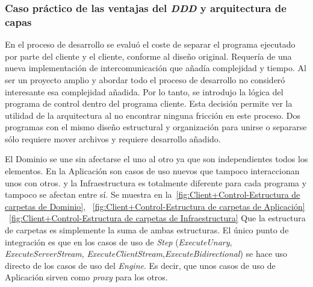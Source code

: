 \subsubsection{Caso práctico de las ventajas del \textit{DDD} y arquitectura de capas}

En el proceso de desarrollo se evaluó el coste de separar el programa ejecutado por parte del cliente y el cliente, conforme al diseño original.
Requería de una nueva implementación de intercomunicación que añadía complejidad y tiempo.
Al ser un proyecto amplio y abordar todo el proceso de desarrollo no consideró interesante esa complejidad añadida.
Por lo tanto, se introdujo la lógica del programa de control dentro del programa cliente.
Esta decisión permite ver la utilidad de la arquitectura al no encontrar ninguna fricción en este proceso.
Dos programas con el mismo diseño estructural y organización para unirse o separarse sólo requiere mover archivos y requiere desarrollo añadido.

El Dominio se une sin afectarse el uno al otro ya que son independientes todos los elementos.
En la Aplicación son casos de uso nuevos que tampoco interaccionan unos con otros.
y la Infraestructura es totalmente diferente para cada programa y tampoco se afectan entre sí.
Se muestra en la~\cref{fig:Client+Control-Estructura de carpetas de Dominio},
~\cref{fig:Client+Control-Estructura de carpetas de Aplicación}
~\cref{fig:Client+Control-Estructura de carpetas de Infraestructura}
Que la estructura de carpetas es simplemente la suma de ambas estructuras.
El único punto de integración es que en los casos de uso de \textit{Step} (\textit{ExecuteUnary}, \textit{ExecuteServerStream}, \textit{ExecuteClientStream},\textit{ExecuteBidirectional}) se hace uso directo de los casos de uso del \textit{Engine}.
Es decir, que unos casos de uso de Aplicación sirven como \textit{proxy} para los otros.

